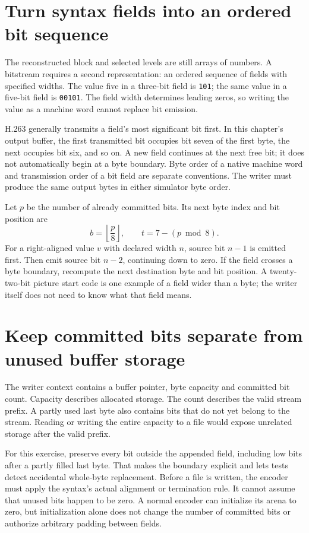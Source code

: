 \section{Turn syntax fields into an ordered bit sequence}
The reconstructed block and selected levels are still arrays of numbers. A
bitstream requires a second representation: an ordered sequence of fields with
specified widths. The value five in a three-bit field is \texttt{101}; the same
value in a five-bit field is \texttt{00101}. The field width determines leading
zeros, so writing the value as a machine word cannot replace bit emission.

H.263 generally transmits a field's most significant bit first. In this chapter's
output buffer, the first transmitted bit occupies bit seven of the first byte,
the next occupies bit six, and so on. A new field continues at the next free bit;
it does not automatically begin at a byte boundary. Byte order of a native
machine word and transmission order of a bit field are separate conventions.
The writer must produce the same output bytes in either simulator byte order.

Let $p$ be the number of already committed bits. Its next byte index and bit
position are
\[
  b=\left\lfloor\frac p8\right\rfloor,\qquad t=7-(p\bmod8).
\]
For a right-aligned value $v$ with declared width $n$, source bit $n-1$ is
emitted first. Then emit source bit $n-2$, continuing down to zero. If the field
crosses a byte boundary, recompute the next destination byte and bit position.
A twenty-two-bit picture start code is one example of a field wider than a byte;
the writer itself does not need to know what that field means.

\section{Keep committed bits separate from unused buffer storage}
The writer context contains a buffer pointer, byte capacity and committed bit
count. Capacity describes allocated storage. The count describes the valid stream
prefix. A partly used last byte also contains bits that do not yet belong to the
stream. Reading or writing the entire capacity to a file would expose unrelated
storage after the valid prefix.

For this exercise, preserve every bit outside the appended field, including low
bits after a partly filled last byte. That makes the boundary explicit and lets
tests detect accidental whole-byte replacement. Before a file is written, the
encoder must apply the syntax's actual alignment or termination rule. It cannot
assume that unused bits happen to be zero. A normal encoder can initialize its
arena to zero, but initialization alone does not change the number of committed
bits or authorize arbitrary padding between fields.

